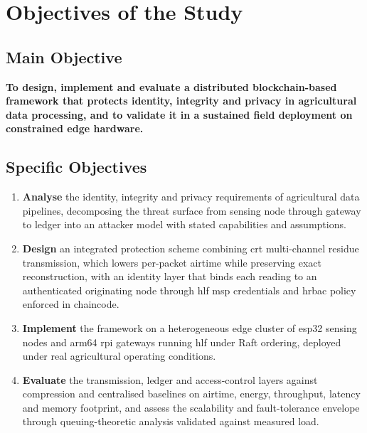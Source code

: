 \documentclass[12pt,a4paper,oneside]{book}
\begin{document}
\section{Objectives of the Study}
\label{sec:objectives}

\subsection{Main Objective}
\label{subsec:main_objective}

\textbf{To design, implement and evaluate a distributed blockchain-based
framework that protects identity, integrity and privacy in agricultural data
processing, and to validate it in a sustained field deployment on constrained
edge hardware.}

\subsection{Specific Objectives}
\label{subsec:specific_objectives}

\begin{enumerate}
  \item \textbf{Analyse} the identity, integrity and privacy requirements of
        agricultural data pipelines, decomposing the threat surface from
        sensing node through gateway to ledger into an attacker model with
        stated capabilities and assumptions.

  \item \textbf{Design} an integrated protection scheme combining \gls{crt}
        multi-channel residue transmission, which lowers per-packet airtime
        while preserving exact reconstruction, with an identity layer that
        binds each reading to an authenticated originating node through
        \gls{hlf} \gls{msp} credentials and \gls{hrbac} policy enforced in
        chaincode.

  \item \textbf{Implement} the framework on a heterogeneous edge cluster of
        \gls{esp32} sensing nodes and \gls{arm64} \gls{rpi} gateways running
        \gls{hlf} under Raft ordering, deployed under real agricultural
        operating conditions.

  \item \textbf{Evaluate} the transmission, ledger and access-control layers
        against compression and centralised baselines on airtime, energy,
        throughput, latency and memory footprint, and assess the scalability
        and fault-tolerance envelope through queuing-theoretic analysis
        validated against measured load.
\end{enumerate}
\end{document}
